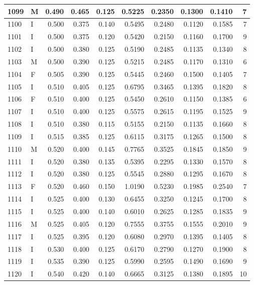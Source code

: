 \documentclass[9pt,twocolumn,twoside,]{pnas-new}
\begin{document}
\begin{tabular}{l|l|r|r|r|r|r|r|r|r}
\hline
1099 & M & 0.490 & 0.465 & 0.125 & 0.5225 & 0.2350 & 0.1300 & 0.1410 & 7\\
\hline
1100 & I & 0.500 & 0.375 & 0.140 & 0.5495 & 0.2480 & 0.1120 & 0.1585 & 7\\
\hline
1101 & I & 0.500 & 0.375 & 0.120 & 0.5420 & 0.2150 & 0.1160 & 0.1700 & 9\\
\hline
1102 & I & 0.500 & 0.380 & 0.125 & 0.5190 & 0.2485 & 0.1135 & 0.1340 & 8\\
\hline
1103 & M & 0.500 & 0.390 & 0.125 & 0.5215 & 0.2485 & 0.1170 & 0.1310 & 6\\
\hline
1104 & F & 0.505 & 0.390 & 0.125 & 0.5445 & 0.2460 & 0.1500 & 0.1405 & 7\\
\hline
1105 & I & 0.510 & 0.405 & 0.125 & 0.6795 & 0.3465 & 0.1395 & 0.1820 & 8\\
\hline
1106 & F & 0.510 & 0.400 & 0.125 & 0.5450 & 0.2610 & 0.1150 & 0.1385 & 6\\
\hline
1107 & I & 0.510 & 0.400 & 0.125 & 0.5575 & 0.2615 & 0.1195 & 0.1525 & 9\\
\hline
1108 & I & 0.510 & 0.380 & 0.115 & 0.5155 & 0.2150 & 0.1135 & 0.1660 & 8\\
\hline
1109 & I & 0.515 & 0.385 & 0.125 & 0.6115 & 0.3175 & 0.1265 & 0.1500 & 8\\
\hline
1110 & M & 0.520 & 0.400 & 0.145 & 0.7765 & 0.3525 & 0.1845 & 0.1850 & 9\\
\hline
1111 & I & 0.520 & 0.380 & 0.135 & 0.5395 & 0.2295 & 0.1330 & 0.1570 & 8\\
\hline
1112 & I & 0.520 & 0.380 & 0.125 & 0.5545 & 0.2880 & 0.1295 & 0.1670 & 8\\
\hline
1113 & F & 0.520 & 0.460 & 0.150 & 1.0190 & 0.5230 & 0.1985 & 0.2540 & 7\\
\hline
1114 & I & 0.525 & 0.400 & 0.130 & 0.6455 & 0.3250 & 0.1245 & 0.1700 & 8\\
\hline
1115 & I & 0.525 & 0.400 & 0.140 & 0.6010 & 0.2625 & 0.1285 & 0.1835 & 9\\
\hline
1116 & M & 0.525 & 0.405 & 0.120 & 0.7555 & 0.3755 & 0.1555 & 0.2010 & 9\\
\hline
1117 & I & 0.525 & 0.395 & 0.120 & 0.6080 & 0.2970 & 0.1395 & 0.1405 & 8\\
\hline
1118 & I & 0.530 & 0.400 & 0.125 & 0.6170 & 0.2790 & 0.1270 & 0.1900 & 8\\
\hline
1119 & I & 0.535 & 0.390 & 0.125 & 0.5990 & 0.2595 & 0.1490 & 0.1690 & 9\\
\hline
1120 & I & 0.540 & 0.420 & 0.140 & 0.6665 & 0.3125 & 0.1380 & 0.1895 & 10\\

\end{tabular}
\end{document}
